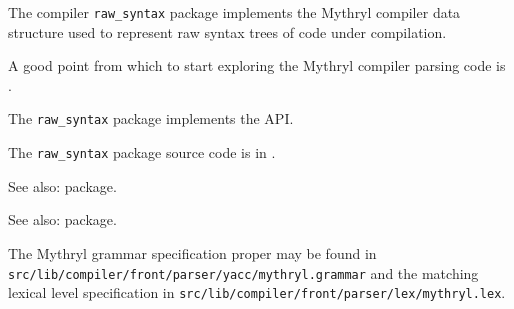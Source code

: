 
The compiler {\tt raw\_syntax} package implements the Mythryl compiler data structure 
used to represent raw syntax trees of code under compilation.

A good point from which to start exploring the Mythryl compiler parsing code is 
.

The {\tt raw\_syntax} package implements the  API.

The {\tt raw\_syntax} package source code is in .

See also:   package.

See also:   package.

The Mythryl grammar specification proper may be found in {\tt src/lib/compiler/front/parser/yacc/mythryl.grammar} 
and the matching lexical level specification in {\tt src/lib/compiler/front/parser/lex/mythryl.lex}.



